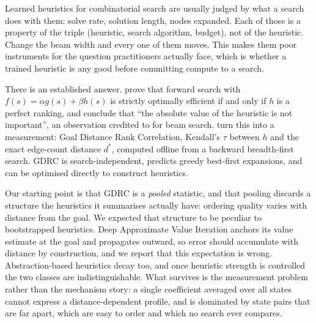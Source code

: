 \documentclass{article}
\begin{document}
Learned heuristics for combinatorial search are usually judged by what a search
does with them: solve rate, solution length, nodes expanded. Each of those is a
property of the triple (heuristic, search algorithm, budget), not of the
heuristic. Change the beam width and every one of them moves. This makes them
poor instruments for the question practitioners actually face, which is whether a
trained heuristic is any good before committing compute to a search.

There is an established answer. \citet{chrestien2023} prove that forward search
with $f(s) = \alpha g(s) + \beta h(s)$ is strictly optimally efficient if and only
if $h$ is a perfect ranking, and conclude that ``the absolute value of the
heuristic is not important'', an observation credited to
\citet{xu2009} for beam search. \citet{wilt2016} turn this into a measurement:
Goal Distance Rank Correlation, Kendall's $\tau$ between $h$ and the exact
edge-count distance $d^*$, computed offline from a backward breadth-first search.
GDRC is search-independent, predicts greedy best-first expansions, and can be
optimised directly to construct heuristics.

Our starting point is that GDRC is a \emph{pooled} statistic, and that pooling
discards a structure the heuristics it summarises actually have: ordering quality
varies with distance from the goal. We expected that structure to be peculiar to
bootstrapped heuristics. Deep Approximate Value Iteration
\citep{agostinelli2019} anchors its value estimate at the goal and propagates
outward, so error should accumulate with distance by construction, and we
report that this expectation is wrong. Abstraction-based heuristics decay too,
and once heuristic strength is controlled the two classes are
indistinguishable. What survives is the measurement problem rather than the
mechanism story: a single coefficient averaged over all states cannot express a
distance-dependent profile, and is dominated by state pairs that are far apart,
which are easy to order and which no search ever compares.
\end{document}
